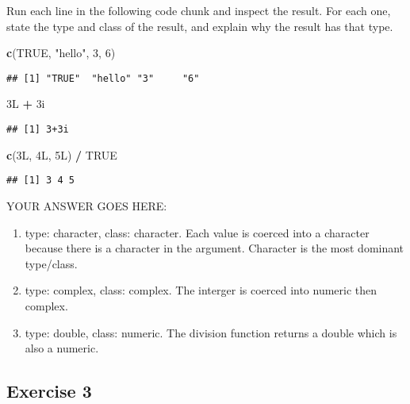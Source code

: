 \documentclass[
]{article}
\newenvironment{Shaded}{\begin{snugshade}}{\end{snugshade}}
\newcommand{\DecValTok}[1]{\textcolor[rgb]{0.00,0.00,0.81}{#1}}
\newcommand{\KeywordTok}[1]{\textcolor[rgb]{0.13,0.29,0.53}{\textbf{#1}}}
\newcommand{\NormalTok}[1]{#1}
\newcommand{\OperatorTok}[1]{\textcolor[rgb]{0.81,0.36,0.00}{\textbf{#1}}}
\newcommand{\OtherTok}[1]{\textcolor[rgb]{0.56,0.35,0.01}{#1}}
\newcommand{\StringTok}[1]{\textcolor[rgb]{0.31,0.60,0.02}{#1}}
\providecommand{\tightlist}{%
  \setlength{\itemsep}{0pt}\setlength{\parskip}{0pt}}
\begin{document}
Run each line in the following code chunk and inspect the result. For
each one, state the type and class of the result, and explain why the
result has that type.

\begin{Shaded}
\begin{Highlighting}[]
\KeywordTok{c}\NormalTok{(}\OtherTok{TRUE}\NormalTok{, }\StringTok{"hello"}\NormalTok{, }\DecValTok{3}\NormalTok{, }\DecValTok{6}\NormalTok{)}
\end{Highlighting}
\end{Shaded}

\begin{verbatim}
## [1] "TRUE"  "hello" "3"     "6"
\end{verbatim}

\begin{Shaded}
\begin{Highlighting}[]
\NormalTok{3L }\OperatorTok{+}\StringTok{ }\NormalTok{3i}
\end{Highlighting}
\end{Shaded}

\begin{verbatim}
## [1] 3+3i
\end{verbatim}

\begin{Shaded}
\begin{Highlighting}[]
\KeywordTok{c}\NormalTok{(3L, 4L, 5L) }\OperatorTok{/}\StringTok{ }\OtherTok{TRUE}
\end{Highlighting}
\end{Shaded}

\begin{verbatim}
## [1] 3 4 5
\end{verbatim}

YOUR ANSWER GOES HERE:

\begin{enumerate}
\def\labelenumi{\arabic{enumi}.}
\tightlist
\item
  type: character, class: character. Each value is coerced into a
  character because there is a character in the argument. Character is
  the most dominant type/class.
\item
  type: complex, class: complex. The interger is coerced into numeric
  then complex.
\item
  type: double, class: numeric. The division function returns a double
  which is also a numeric.
\end{enumerate}

\hypertarget{exercise-3}{%
\subsection{Exercise 3}\label{exercise-3}}
\end{document}

